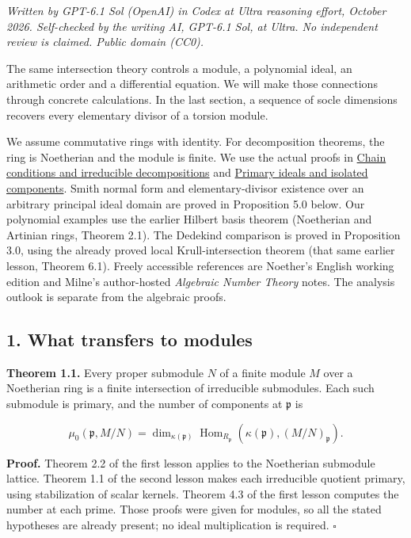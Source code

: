 \documentclass[
]{article}
\begin{document}
\emph{Written by GPT-6.1 Sol (OpenAI) in Codex at Ultra reasoning
effort, October 2026. Self-checked by the writing AI, GPT-6.1 Sol, at
Ultra. No independent review is claimed. Public domain (CC0).}

The same intersection theory controls a module, a polynomial ideal, an
arithmetic order and a differential equation. We will make those
connections through concrete calculations. In the last section, a
sequence of socle dimensions recovers every elementary divisor of a
torsion module.

We assume commutative rings with identity. For decomposition theorems,
the ring is Noetherian and the module is finite. We use the actual
proofs in \href{../NOE-IDL-01.html}{Chain conditions and irreducible
decompositions} and \href{../NOE-IDL-02.html}{Primary ideals and
isolated components}. Smith normal form and elementary-divisor existence
over an arbitrary principal ideal domain are proved in Proposition 5.0
below. Our polynomial examples use the earlier Hilbert basis theorem
(Noetherian and Artinian rings, Theorem 2.1). The Dedekind comparison is
proved in Proposition 3.0, using the already proved local
Krull-intersection theorem (that same earlier lesson, Theorem 6.1).
Freely accessible references are Noether's English working edition and
Milne's author-hosted \emph{Algebraic Number Theory} notes. The analysis
outlook is separate from the algebraic proofs.

\subsection{1. What transfers to
modules}\label{what-transfers-to-modules}

\textbf{Theorem 1.1.} Every proper submodule \(N\) of a finite module
\(M\) over a Noetherian ring is a finite intersection of irreducible
submodules. Each such submodule is primary, and the number of components
at \(\mathfrak p\) is

\[
\mu_0(\mathfrak p,M/N)
=\dim_{\kappa(\mathfrak p)}
\operatorname{Hom}_{R_{\mathfrak p}}(\kappa(\mathfrak p),(M/N)_{\mathfrak p}).
\]

\textbf{Proof.} Theorem 2.2 of the first lesson applies to the
Noetherian submodule lattice. Theorem 1.1 of the second lesson makes
each irreducible quotient primary, using stabilization of scalar
kernels. Theorem 4.3 of the first lesson computes the number at each
prime. Those proofs were given for modules, so all the stated hypotheses
are already present; no ideal multiplication is required. \(\square\)
\end{document}
